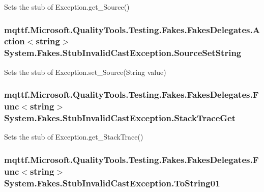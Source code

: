 Sets the stub of Exception.\-get\-\_\-\-Source()

\hypertarget{class_system_1_1_fakes_1_1_stub_invalid_cast_exception_aa6a4bbcb15019dc72cbb20a66b2e2160}{
\subsubsection[{Source\-Set\-String}]{\setlength{\rightskip}{0pt plus 5cm}mqttf.\-Microsoft.\-Quality\-Tools.\-Testing.\-Fakes.\-Fakes\-Delegates.\-Action$<$string$>$ System.\-Fakes.\-Stub\-Invalid\-Cast\-Exception.\-Source\-Set\-String}}\label{class_system_1_1_fakes_1_1_stub_invalid_cast_exception_aa6a4bbcb15019dc72cbb20a66b2e2160}


Sets the stub of Exception.\-set\-\_\-\-Source(\-String value)

\hypertarget{class_system_1_1_fakes_1_1_stub_invalid_cast_exception_acb75cf3711fce6b2f37ab82e0f276235}{
\subsubsection[{Stack\-Trace\-Get}]{\setlength{\rightskip}{0pt plus 5cm}mqttf.\-Microsoft.\-Quality\-Tools.\-Testing.\-Fakes.\-Fakes\-Delegates.\-Func$<$string$>$ System.\-Fakes.\-Stub\-Invalid\-Cast\-Exception.\-Stack\-Trace\-Get}}\label{class_system_1_1_fakes_1_1_stub_invalid_cast_exception_acb75cf3711fce6b2f37ab82e0f276235}


Sets the stub of Exception.\-get\-\_\-\-Stack\-Trace()

\hypertarget{class_system_1_1_fakes_1_1_stub_invalid_cast_exception_a682ef97dc3160f650494429b92165356}{
\subsubsection[{To\-String01}]{\setlength{\rightskip}{0pt plus 5cm}mqttf.\-Microsoft.\-Quality\-Tools.\-Testing.\-Fakes.\-Fakes\-Delegates.\-Func$<$string$>$ System.\-Fakes.\-Stub\-Invalid\-Cast\-Exception.\-To\-String01}}\label{class_system_1_1_fakes_1_1_stub_invalid_cast_exception_a682ef97dc3160f650494429b92165356}


